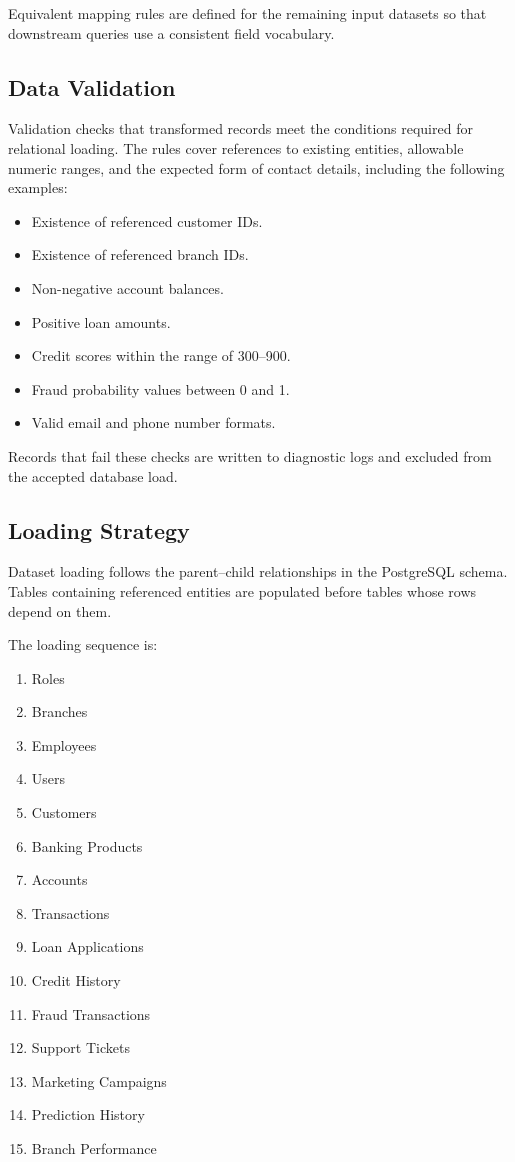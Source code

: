 \documentclass[conference]{IEEEtran}
\begin{document}
Equivalent mapping rules are defined for the remaining input datasets so that downstream queries use a consistent field vocabulary.

\subsection{Data Validation}

Validation checks that transformed records meet the conditions required for relational loading. The rules cover references to existing entities, allowable numeric ranges, and the expected form of contact details, including the following examples:

\begin{itemize}
    \item Existence of referenced customer IDs.
    \item Existence of referenced branch IDs.
    \item Non-negative account balances.
    \item Positive loan amounts.
    \item Credit scores within the range of 300--900.
    \item Fraud probability values between 0 and 1.
    \item Valid email and phone number formats.
\end{itemize}

Records that fail these checks are written to diagnostic logs and excluded from the accepted database load.

\subsection{Loading Strategy}

Dataset loading follows the parent--child relationships in the PostgreSQL schema. Tables containing referenced entities are populated before tables whose rows depend on them.

The loading sequence is:

\begin{enumerate}
    \item Roles
    \item Branches
    \item Employees
    \item Users
    \item Customers
    \item Banking Products
    \item Accounts
    \item Transactions
    \item Loan Applications
    \item Credit History
    \item Fraud Transactions
    \item Support Tickets
    \item Marketing Campaigns
    \item Prediction History
    \item Branch Performance
\end{enumerate}
\end{document}
